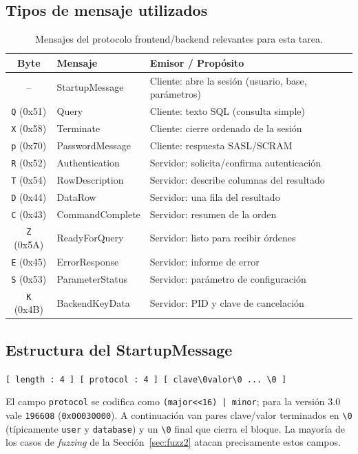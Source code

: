 \documentclass[11pt]{article}
\begin{document}
\subsection{Tipos de mensaje utilizados}
\begin{table}[H]
\centering
\caption{Mensajes del protocolo frontend/backend relevantes para esta tarea.}
\begin{tabular}{cll}
\toprule
\textbf{Byte} & \textbf{Mensaje} & \textbf{Emisor / Propósito} \\
\midrule
-- & StartupMessage   & Cliente: abre la sesión (usuario, base, parámetros) \\
\texttt{Q} (0x51) & Query            & Cliente: texto SQL (consulta simple) \\
\texttt{X} (0x58) & Terminate        & Cliente: cierre ordenado de la sesión \\
\texttt{p} (0x70) & PasswordMessage  & Cliente: respuesta SASL/SCRAM \\
\texttt{R} (0x52) & Authentication   & Servidor: solicita/confirma autenticación \\
\texttt{T} (0x54) & RowDescription   & Servidor: describe columnas del resultado \\
\texttt{D} (0x44) & DataRow          & Servidor: una fila del resultado \\
\texttt{C} (0x43) & CommandComplete  & Servidor: resumen de la orden \\
\texttt{Z} (0x5A) & ReadyForQuery    & Servidor: listo para recibir órdenes \\
\texttt{E} (0x45) & ErrorResponse    & Servidor: informe de error \\
\texttt{S} (0x53) & ParameterStatus  & Servidor: parámetro de configuración \\
\texttt{K} (0x4B) & BackendKeyData   & Servidor: PID y clave de cancelación \\
\bottomrule
\end{tabular}
\end{table}

\subsection{Estructura del StartupMessage}
\begin{center}
\texttt{[ length : 4 ] [ protocol : 4 ] [ clave\textbackslash0valor\textbackslash0 ... \textbackslash0 ]}
\end{center}
El campo \texttt{protocol} se codifica como \texttt{(major<<16) | minor}; para la
versión 3.0 vale \texttt{196608} (\texttt{0x00030000}). A continuación van pares
clave/valor terminados en \texttt{\textbackslash0} (típicamente \texttt{user} y
\texttt{database}) y un \texttt{\textbackslash0} final que cierra el bloque. La
mayoría de los casos de \emph{fuzzing} de la Sección~\ref{sec:fuzz2} atacan
precisamente estos campos.
\end{document}
